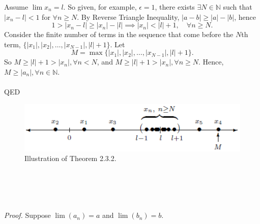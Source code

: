 \documentclass{article}
\begin{document}
                Assume $\lim x_n=l$. So given, for example, $\epsilon=1$, there exists $\exists N \in \mathbb{N}$ such that $|x_n-l|<1$ for $\forall n \geq N$. By Reverse Triangle Inequality, $|a-b| \geq |a|-|b|$, hence 
                \begin{equation*}
                    1 > |x_n-l| \geq |x_n|-|l| \implies |x_n|<|l|+1, \quad \forall n \geq N.
                \end{equation*}
                Consider the finite number of terms in the sequence that come before the $N$th term, $\{|x_1|,|x_2|,\dots,|x_{N-1}|,|l|+1\}$. Let
                \begin{equation*}
                    M=\max\{|x_1|,|x_2|,\dots,|x_{N-1}|,|l|+1\}.
                \end{equation*}
                So $M \geq |l|+1 > |x_n|,\forall n < N$, and $M \geq |l|+1 > |x_n|,\forall n \geq N$. Hence, $M \geq |a_n|, \forall n \in \mathbb{N}$. \\ \\
                QED
                \begin{figure}[ht!]
                    \centering
                    \includegraphics[width=0.6\linewidth]{figs/theorem2.3.2.png}
                    \caption{Illustration of Theorem 2.3.2.}
                \end{figure}
                \\ \\
                \\ \\
                \textit{Proof.} Suppose $\lim(a_n)=a$ and $\lim(b_n)=b$.\\ \\
\end{document}
